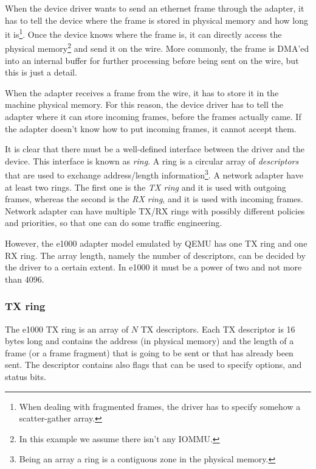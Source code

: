 When the device driver wants to send an ethernet frame through the adapter, it has to tell the device where the frame is stored
in physical memory and how long it is\footnote{When dealing with fragmented frames, the driver has to specify somehow a scatter-gather
array.}. Once the device knows where the frame is, it can directly access the physical memory\footnote{In this example we assume
there isn't any IOMMU.} and send it on the wire. More commonly, the frame is DMA'ed into an internal buffer for further processing before
being sent on the wire, but this is just a detail.

When the adapter receives a frame from the wire, it has to store it in the machine physical memory. For this reason, the device driver
has to tell the adapter where it can store incoming frames, before the frames actually came. If the adapter doesn't know how to put
incoming frames, it cannot accept them.

\vspace{0.5cm}

It is clear that there must be a well-defined interface between the driver and the device. This interface is known as \emph{ring}.
A ring is a circular array of \emph{descriptors} that are used to exchange address/length information\footnote{Being an array a ring is a 
contiguous zone in the physical memory.}. A network adapter have at least two rings.
The first one is the \emph{TX ring} and it is used with outgoing frames, whereas the second is the \emph{RX ring}, and it is used with
incoming frames. Network adapter can have multiple TX/RX rings with possibly different policies and priorities, so that one can
do some traffic engineering.

However, the e1000 adapter model emulated by QEMU has one TX ring and one RX ring. The array length, namely the number of descriptors,
can be decided by the driver to a certain extent. In e1000 it must be a power of two and not more than 4096.


\subsubsection{TX ring}
\label{sec:txring}
The e1000 TX ring is an array of $N$ TX descriptors. Each TX descriptor is 16 bytes long and contains the address (in physical memory) and the
length of a frame (or a frame fragment) that is going to be sent or that has already been sent. The descriptor contains also flags that
can be used to specify options, and status bits. 

